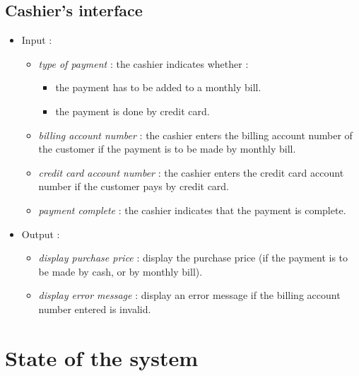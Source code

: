 \documentclass[11pt, a4paper]{article}
\newcommand{\data}[1]{\textit{#1}}
\begin{document}
\subsection{Cashier's interface}

\begin{itemize}
\item Input :
		\begin{itemize}
		\item \data{type of payment} : the cashier indicates whether : 
					\begin{itemize}
					\item the payment has to be added to a monthly bill.
					\item the payment is done by credit card.
					\end{itemize}
		\item \data{billing account number} : the cashier enters the billing account number of the customer if the payment is to be made by monthly bill.
		\item \data{credit card account number} : the cashier enters the credit card account number if the customer pays by credit card.
		\item \data{payment complete} : the cashier indicates that the payment is complete.
		\end{itemize}

\item Output :
		\begin{itemize}
		\item \data{display purchase price} : display the purchase price (if the payment is to be made by cash, or by monthly bill).
		\item \data{display error message} : display an error message if the billing account number entered is invalid.
		\end{itemize}
\end{itemize}



\section{State of the system}
\end{document}
